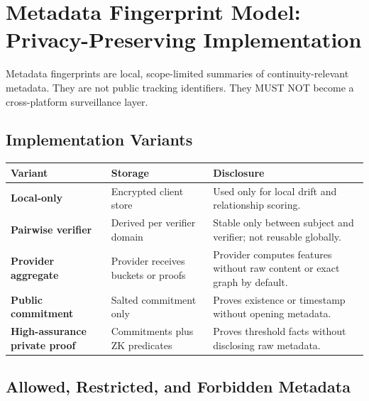 \documentclass[11pt]{article}
\begin{document}
\section{Metadata Fingerprint Model: Privacy-Preserving Implementation}

Metadata fingerprints are local, scope-limited summaries of continuity-relevant metadata. They are not public tracking identifiers. They MUST NOT become a cross-platform surveillance layer.

\subsection{Implementation Variants}

\begin{center}
\begin{tabularx}{\textwidth}{>{\bfseries}p{} p{} X}
\toprule
Variant & Storage & Disclosure \\
\midrule
Local-only & Encrypted client store & Used only for local drift and relationship scoring. \\
Pairwise verifier & Derived per verifier domain & Stable only between subject and verifier; not reusable globally. \\
Provider aggregate & Provider receives buckets or proofs & Provider computes features without raw content or exact graph by default. \\
Public commitment & Salted commitment only & Proves existence or timestamp without opening metadata. \\
High-assurance private proof & Commitments plus ZK predicates & Proves threshold facts without disclosing raw metadata. \\
\bottomrule
\end{tabularx}
\end{center}

\subsection{Allowed, Restricted, and Forbidden Metadata}
\end{document}
